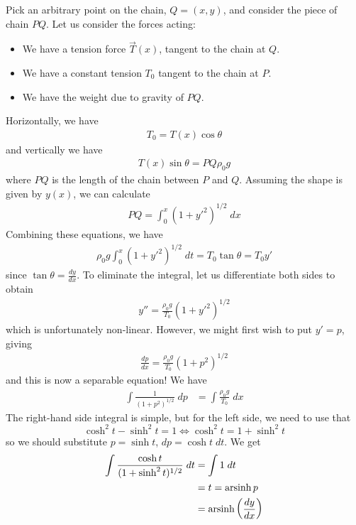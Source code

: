 \documentclass{../template/note}
\begin{document}
    Pick an arbitrary point on the chain, $Q = (x, y)$, and consider the piece of chain $PQ$. Let us consider the forces acting:
    \begin{itemize}
        \item We have a tension force $\vec T(x)$, tangent to the chain at $Q$.
        \item We have a constant tension $T_0$ tangent to the chain at $P$.
        \item We have the weight due to gravity of $PQ$.
    \end{itemize}
    Horizontally, we have
    \begin{align}
        T_0 = T(x) \cos \theta
    \end{align}
    and vertically we have
    \begin{align}
        T(x) \sin \theta = PQ \rho_0 g
    \end{align}
    where $PQ$ is the length of the chain between $P$ and $Q$. Assuming the shape is given by $y(x)$, we can calculate
    \begin{align}
        PQ = \int_0^x \left(1 + y'^2\right)^{1/2} \; dx
    \end{align}
    Combining these equations, we have
    \begin{align}
        \rho_0 g \int_0^x \left(1 + y'^2\right)^{1/2} \; dt = T_0 \tan \theta = T_0 y'
    \end{align}
    since $\tan \theta = \frac{dy}{dx}$. To eliminate the integral, let us differentiate both sides to obtain
    \begin{align*}
        y'' = \frac{\rho_0g}{T_0}\left(1+y'^2\right)^{1/2}
    \end{align*}
    which is unfortunately non-linear. However, we might first wish to put $y' = p$, giving
    \begin{align*}
        \frac{dp}{dx} = \frac{\rho_0g}{T_0}\left(1+p^2\right)^{1/2}
    \end{align*}
    and this is now a separable equation! We have
    \begin{align*}
        \int \frac{1}{(1+p^2)^{1/2}} \; dp &= \int \frac{\rho_0g}{T_0} \; dx
    \end{align*}
    The right-hand side integral is simple, but for the left side, we need to use that
    \[
        \cosh^2 t - \sinh^2 t = 1 \iff \cosh^2 t = 1 + \sinh^2 t
    \]
    so we should substitute $p = \sinh t$, $dp = \cosh t \; dt$. We get
    \begin{align*}
        \int \frac{\cosh t}{(1+\sinh^2t)^{1/2}} \; dt &= \int 1 \; dt \\
        &= t = \operatorname{arsinh} p \\
        &= \operatorname{arsinh}\left(\frac{dy}{dx}\right)
    \end{align*}
\end{document}
